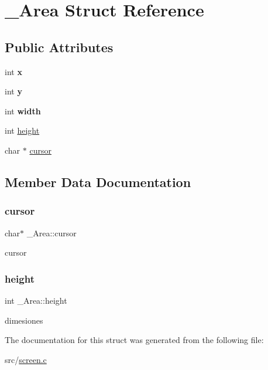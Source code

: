 \hypertarget{struct__Area}{}\section{\+\_\+\+Area Struct Reference}
\label{struct__Area}
\subsection*{Public Attributes}
\begin{DoxyCompactItemize}
\item 
\mbox{\label{struct__Area_a093b8c2929094bac88bbf5ee7db85573}} 
int {\bfseries x}
\item 
\mbox{\label{struct__Area_a867e601f05480db03237c3a17d4c77f8}} 
int {\bfseries y}
\item 
\mbox{\label{struct__Area_aa2f753fc3d254821603ac4512db814f1}} 
int {\bfseries width}
\item 
int \hyperlink{struct__Area_a22627de8e529d631c17157f1f68cb5ac}{height}
\item 
char $\ast$ \hyperlink{struct__Area_aa042b0549789b75fd133b67ad7d0fd9d}{cursor}
\end{DoxyCompactItemize}


\subsection{Member Data Documentation}
\mbox{\label{struct__Area_aa042b0549789b75fd133b67ad7d0fd9d}} 
\subsubsection{\texorpdfstring{cursor}{cursor}}
{\footnotesize\ttfamily char$\ast$ \+\_\+\+Area\+::cursor}

cursor \mbox{\label{struct__Area_a22627de8e529d631c17157f1f68cb5ac}} 
\subsubsection{\texorpdfstring{height}{height}}
{\footnotesize\ttfamily int \+\_\+\+Area\+::height}

dimesiones 

The documentation for this struct was generated from the following file\+:\begin{DoxyCompactItemize}
\item 
src/\hyperlink{screen_8c}{screen.\+c}\end{DoxyCompactItemize}
